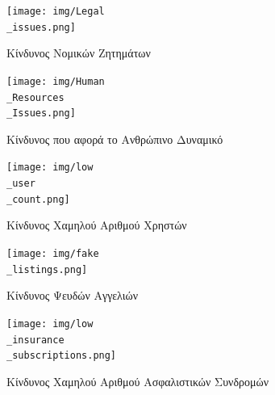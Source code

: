 \documentclass{../ol-softwaremanual}
\begin{document}
	\newpage
	
	\begin{figure}[htbp!]
		\texttt{[image: img/Legal\\\_issues.png]}
		\caption{Κίνδυνος Νομικών Ζητημάτων}
	\end{figure}
	
	
	\newpage
	
	\begin{figure}[htbp!]
		\texttt{[image: img/Human\\\_Resources\\\_Issues.png]}
		\caption{Kίνδυνος που αφορά το Ανθρώπινο Δυναμικό}
	\end{figure}

	\newpage

\begin{figure}[htbp!]
	\texttt{[image: img/low\\\_user\\\_count.png]}
	\caption{Kίνδυνος Χαμηλού Αριθμού Χρηστών}
\end{figure}
	
	\newpage
	\begin{figure}[htbp!]
		\texttt{[image: img/fake\\\_listings.png]}
		\caption{Kίνδυνος Ψευδών Αγγελιών}
	\end{figure}
	
	\newpage
	
	\begin{figure}[htbp!]
			\texttt{[image: img/low\\\_insurance\\\_subscriptions.png]}
		\caption{Kίνδυνος Χαμηλού Αριθμού Ασφαλιστικών Συνδρομών}
	\end{figure}
	
\end{document}
